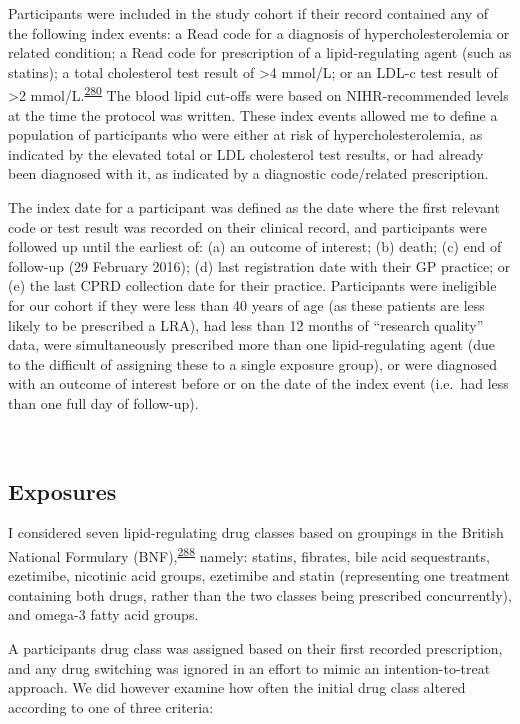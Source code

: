 \documentclass[a4paper, twoside]{templates/ociamthesis}
\begin{document}
Participants were included in the study cohort if their record contained any of the following index events: a Read code for a diagnosis of hypercholesterolemia or related condition; a Read code for prescription of a lipid-regulating agent (such as statins); a total cholesterol test result of \textgreater4 mmol/L; or an LDL-c test result of \textgreater2 mmol/L.\textsuperscript{\protect\hyperlink{ref-walker2016}{280}} The blood lipid cut-offs were based on NIHR-recommended levels at the time the protocol was written. These index events allowed me to define a population of participants who were either at risk of hypercholesterolemia, as indicated by the elevated total or LDL cholesterol test results, or had already been diagnosed with it, as indicated by a diagnostic code/related prescription.

The index date for a participant was defined as the date where the first relevant code or test result was recorded on their clinical record, and participants were followed up until the earliest of: (a) an outcome of interest; (b) death; (c) end of follow-up (29 February 2016); (d) last registration date with their GP practice; or (e) the last CPRD collection date for their practice. Participants were ineligible for our cohort if they were less than 40 years of age (as these patients are less likely to be prescribed a LRA), had less than 12 months of ``research quality'' data, were simultaneously prescribed more than one lipid-regulating agent (due to the difficult of assigning these to a single exposure group), or were diagnosed with an outcome of interest before or on the date of the index event (i.e.~had less than one full day of follow-up).

~

\hypertarget{exposures}{%
\subsection{Exposures}\label{exposures}}

I considered seven lipid-regulating drug classes based on groupings in the British National Formulary (BNF),\textsuperscript{\protect\hyperlink{ref-wishart2017}{288}} namely: statins, fibrates, bile acid sequestrants, ezetimibe, nicotinic acid groups, ezetimibe and statin (representing one treatment containing both drugs, rather than the two classes being prescribed concurrently), and omega-3 fatty acid groups.

A participants drug class was assigned based on their first recorded prescription, and any drug switching was ignored in an effort to mimic an intention-to-treat approach. We did however examine how often the initial drug class altered according to one of three criteria:
\end{document}
